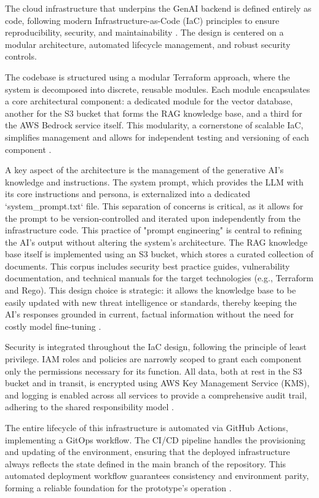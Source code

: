 The cloud infrastructure that underpins the GenAI backend is defined entirely as code, following modern Infrastructure-as-Code (IaC) principles to ensure reproducibility, security, and maintainability \cite{morris_infrastructure_2016}. The design is centered on a modular architecture, automated lifecycle management, and robust security controls.

The codebase is structured using a modular Terraform approach, where the system is decomposed into discrete, reusable modules. Each module encapsulates a core architectural component: a dedicated module for the vector database, another for the S3 bucket that forms the RAG knowledge base, and a third for the AWS Bedrock service itself. This modularity, a cornerstone of scalable IaC, simplifies management and allows for independent testing and versioning of each component \cite{hashicorp_terraform_2022}.

A key aspect of the architecture is the management of the generative AI's knowledge and instructions. The system prompt, which provides the LLM with its core instructions and persona, is externalized into a dedicated `system\_prompt.txt` file. This separation of concerns is critical, as it allows for the prompt to be version-controlled and iterated upon independently from the infrastructure code. This practice of "prompt engineering" is central to refining the AI's output without altering the system's architecture. The RAG knowledge base itself is implemented using an S3 bucket, which stores a curated collection of documents. This corpus includes security best practice guides, vulnerability documentation, and technical manuals for the target technologies (e.g., Terraform and Rego). This design choice is strategic: it allows the knowledge base to be easily updated with new threat intelligence or standards, thereby keeping the AI's responses grounded in current, factual information without the need for costly model fine-tuning \cite{ozgur_simple_2024}.

Security is integrated throughout the IaC design, following the principle of least privilege. IAM roles and policies are narrowly scoped to grant each component only the permissions necessary for its function. All data, both at rest in the S3 bucket and in transit, is encrypted using AWS Key Management Service (KMS), and logging is enabled across all services to provide a comprehensive audit trail, adhering to the shared responsibility model \cite{sarathe_krisshnan_jutoo_vijayaraghavan_policy_2025}.

The entire lifecycle of this infrastructure is automated via GitHub Actions, implementing a GitOps workflow. The CI/CD pipeline handles the provisioning and updating of the environment, ensuring that the deployed infrastructure always reflects the state defined in the main branch of the repository. This automated deployment workflow guarantees consistency and environment parity, forming a reliable foundation for the prototype's operation \cite{wego_gitops_2018}.

